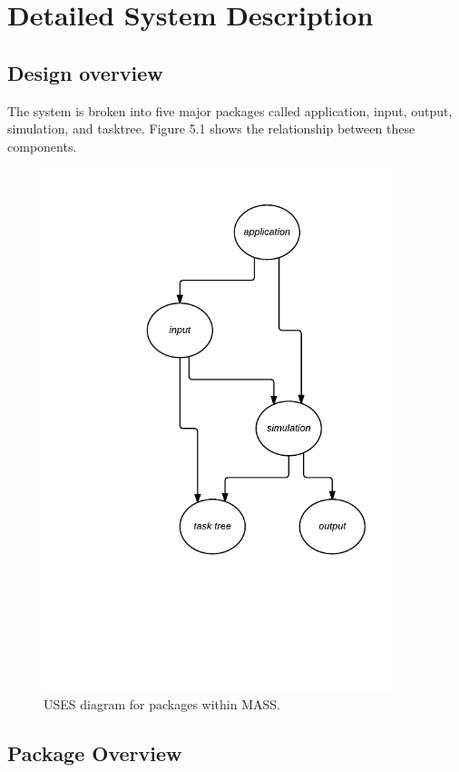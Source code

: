 \chapter{Detailed System Description}\label{detailedSystemDescription}

\section{Design overview}

The system is broken into five major packages called application, input, output, simulation, and tasktree. Figure 5.1 shows the relationship between these components.

\begin{figure}[H]
\centering
\includegraphics[trim=0.5cm 4.0cm 0.5cm 0.5cm,width=4.0in]{figs/UsesDiagram}
\caption{USES diagram for packages within MASS.}
\label{fig:UsesDiagram }
\end{figure}

\section{Package Overview}

